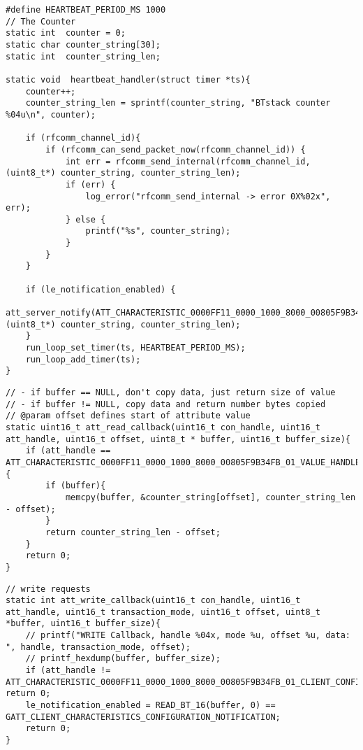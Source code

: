 \begin{lstlisting}[float, caption= SPP\&LE client - heartbeat handler., label=code:spp_le_heartbeat_handler]
#define HEARTBEAT_PERIOD_MS 1000
// The Counter
static int  counter = 0;
static char counter_string[30];
static int  counter_string_len;

static void  heartbeat_handler(struct timer *ts){
    counter++;
    counter_string_len = sprintf(counter_string, "BTstack counter %04u\n", counter);

    if (rfcomm_channel_id){
        if (rfcomm_can_send_packet_now(rfcomm_channel_id)) {
            int err = rfcomm_send_internal(rfcomm_channel_id, (uint8_t*) counter_string, counter_string_len);
            if (err) {
                log_error("rfcomm_send_internal -> error 0X%02x", err);
            } else {
                printf("%s", counter_string);
            }
        }
    }

    if (le_notification_enabled) {
        att_server_notify(ATT_CHARACTERISTIC_0000FF11_0000_1000_8000_00805F9B34FB_01_VALUE_HANDLE, (uint8_t*) counter_string, counter_string_len);
    }
    run_loop_set_timer(ts, HEARTBEAT_PERIOD_MS);
    run_loop_add_timer(ts);
} 
\end{lstlisting}

\begin{lstlisting}[float, caption= SPP\&LE client - ATT Client Read Callback for Dynamic Data., label=code:spp_le_read_callback]
// - if buffer == NULL, don't copy data, just return size of value
// - if buffer != NULL, copy data and return number bytes copied
// @param offset defines start of attribute value
static uint16_t att_read_callback(uint16_t con_handle, uint16_t att_handle, uint16_t offset, uint8_t * buffer, uint16_t buffer_size){
    if (att_handle == ATT_CHARACTERISTIC_0000FF11_0000_1000_8000_00805F9B34FB_01_VALUE_HANDLE){
        if (buffer){
            memcpy(buffer, &counter_string[offset], counter_string_len - offset);
        }
        return counter_string_len - offset;
    }
    return 0;
}
\end{lstlisting}

\begin{lstlisting}[float, caption= SPP\&LE client - ATT Client Write Callback., label=code:spp_le_write_callback]
// write requests
static int att_write_callback(uint16_t con_handle, uint16_t att_handle, uint16_t transaction_mode, uint16_t offset, uint8_t *buffer, uint16_t buffer_size){
    // printf("WRITE Callback, handle %04x, mode %u, offset %u, data: ", handle, transaction_mode, offset);
    // printf_hexdump(buffer, buffer_size);
    if (att_handle != ATT_CHARACTERISTIC_0000FF11_0000_1000_8000_00805F9B34FB_01_CLIENT_CONFIGURATION_HANDLE) return 0;
    le_notification_enabled = READ_BT_16(buffer, 0) == GATT_CLIENT_CHARACTERISTICS_CONFIGURATION_NOTIFICATION;
    return 0;
}
\end{lstlisting}

